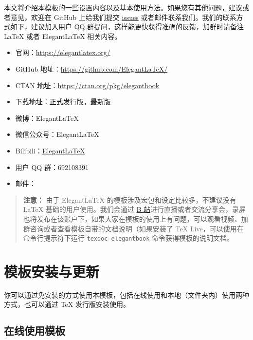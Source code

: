 本文将介绍本模板的一些设置内容以及基本使用方法。如果您有其他问题，建议或者意见，欢迎在 GitHub 上给我们提交 \href{https://github.com/ElegantLaTeX/ElegantBook/issues}{issues} 或者邮件联系我们。我们的联系方式如下，建议加入用户 QQ 群提问，这样能更快获得准确的反馈，加群时请备注 \LaTeX{} 或者 Elegant\LaTeX{} 相关内容。
\begin{itemize}
  \item 官网：\href{https://elegantlatex.org/}{https://elegantlatex.org/}
  \item GitHub 地址：\href{https://github.com/ElegantLaTeX/}{https://github.com/ElegantLaTeX/}
  \item CTAN 地址：\href{https://ctan.org/pkg/elegantbook}{https://ctan.org/pkg/elegantbook}
  \item 下载地址：\href{https://github.com/ElegantLaTeX/ElegantBook/releases}{正式发行版}，\href{https://github.com/ElegantLaTeX/ElegantBook/archive/master.zip}{最新版}
  \item 微博：Elegant\LaTeX{}
  \item 微信公众号：Elegant\LaTeX{}
  \item Bilibili：\href{https://space.bilibili.com/516479629}{ElegantLaTeX}
  \item 用户 QQ 群：692108391
  \item 邮件：
\end{itemize}

\begin{quotation}
  \textbf{注意：} 由于 ElegantLaTeX 的模板涉及宏包和设定比较多，不建议没有 \LaTeX{} 基础的用户使用。我们会通过 \href{https://space.bilibili.com/516479629}{B 站}进行直播或者交流分享会，录屏也将发布在该账户下，如果大家在模板的使用上有问题，可以观看视频、加群咨询或者查看模板自带的文档说明（如果安装了 TeX Live，可以使用在命令行提示符下运行 \lstinline{texdoc elegantbook} 命令获得模板的说明文档。
\end{quotation}


\section{模板安装与更新}

你可以通过免安装的方式使用本模板，包括在线使用和本地（文件夹内）使用两种方式，也可以通过 \TeX{} 发行版安装使用。

\subsection{在线使用模板}


